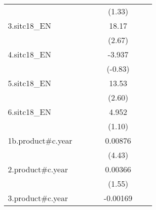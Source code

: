 {\begin{tabular}{l*{6}{c}}
                    &                     &                     &                     &      (1.33)         &                     &                     \\
[1em]
3.sitc18\_EN         &                     &                     &                     &       18.17\sym{**} &                     &                     \\
                    &                     &                     &                     &      (2.67)         &                     &                     \\
[1em]
4.sitc18\_EN         &                     &                     &                     &      -3.937         &                     &                     \\
                    &                     &                     &                     &     (-0.83)         &                     &                     \\
[1em]
5.sitc18\_EN         &                     &                     &                     &       13.53\sym{**} &                     &                     \\
                    &                     &                     &                     &      (2.60)         &                     &                     \\
[1em]
6.sitc18\_EN         &                     &                     &                     &       4.952         &                     &                     \\
                    &                     &                     &                     &      (1.10)         &                     &                     \\
[1em]
1b.product#c.year   &                     &                     &                     &     0.00876\sym{***}&                     &                     \\
                    &                     &                     &                     &      (4.43)         &                     &                     \\
[1em]
2.product#c.year    &                     &                     &                     &     0.00366         &                     &                     \\
                    &                     &                     &                     &      (1.55)         &                     &                     \\
[1em]
3.product#c.year    &                     &                     &                     &    -0.00169         &                     &                     \\

\end{tabular}}
